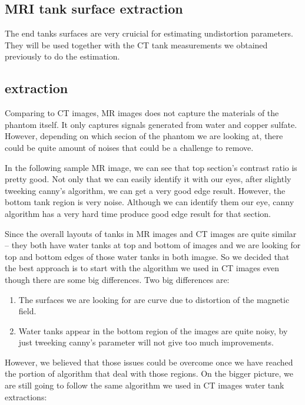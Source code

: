 
\subsection{MRI tank surface extraction}
The end tanks surfaces are very cruicial for estimating undistortion parameters. They will be used together 
with the CT tank measurements we obtained previously to do the estimation.

\subsection{extraction}
Comparing to CT images, MR images does not capture the materials of the phantom itself. It only captures 
signals generated from water and copper sulfate. However, depending on which secion of the phantom we are
looking at, there could be quite amount of noises that could be a challenge to remove. 

In the following sample MR image, we can see that top section's contrast ratio is pretty good. Not only that
we can easily identify it with our eyes, after slightly tweeking canny's algorithm, we can get a very good 
edge result. However, the bottom tank region is very noise. Although we can identify them our eye, canny
algorithm has a very hard time produce good edge result for that section. 

Since the overall layouts of tanks in MR images and CT images are quite similar -- they both have water tanks
at top and bottom of images and we are looking for top and bottom edges of those water tanks in both imagse.
So we decided that the best approach is to start with the algorithm we used in CT images even though there
are some big differences. Two big differences are:

\begin{enumerate}
  \item The surfaces we are looking for are curve due to distortion of the magnetic field.
  \item Water tanks appear in the bottom region of the images are quite noisy, by just tweeking canny's
    parameter will not give too much improvements.
\end{enumerate}

However, we believed that those issues could be overcome once we have reached the portion of algorithm that 
deal with those regions. On the bigger picture, we are still going to follow the same algorithm we used in
CT images water tank extractions:

